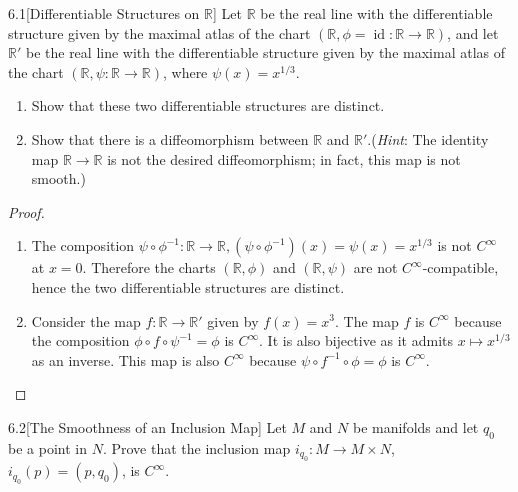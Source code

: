 \begin{problem}{6.1}[Differentiable Structures on \(\mathbb{R}\)]
Let \(\mathbb{R}\) be the real line with the differentiable structure given by the maximal atlas of the chart \((\mathbb{R}, \phi = \operatorname{id} \colon \mathbb{R} \to \mathbb{R})\), and let \(\mathbb{R}'\) be the real line with the differentiable structure given by the maximal atlas of the chart \((\mathbb{R}, \psi \colon \mathbb{R} \to \mathbb{R})\), where \(\psi(x) = x^{1/3}\).

\begin{enumerate}[label={(\alph*)},leftmargin=*]
	\item Show that these two differentiable structures are distinct.
	\item Show that there is a diffeomorphism between \(\mathbb{R}\) and \(\mathbb{R}'\).\@ (\textit{Hint}: The identity map \(\mathbb{R} \to \mathbb{R}\) is not the desired diffeomorphism; in fact, this map is not smooth.)
\end{enumerate}
\end{problem}

\begin{proof}
	\begin{enumerate}[label={(\alph*)},leftmargin=*]
		\item The composition \( \psi \circ \phi^{-1}: \mathbb{R} \to \mathbb{R}, (\psi \circ \phi^{-1})(x) = \psi(x) = x^{1/3} \) is not \( C^{\infty} \) at \( x = 0 \). Therefore the charts \( (\mathbb{R}, \phi) \) and \( (\mathbb{R}, \psi) \) are not \( C^{\infty} \)-compatible, hence the two differentiable structures are distinct.
		\item Consider the map \( f: \mathbb{R} \to \mathbb{R}' \) given by \( f(x) = x^{3} \). The map \( f \) is \( C^{\infty} \) because the composition \( \phi \circ f \circ \psi^{-1} = \phi \) is \( C^{\infty} \). It is also bijective as it admits \( x \mapsto x^{1/3} \) as an inverse. This map is also \( C^{\infty} \) because \( \psi \circ f^{-1} \circ \phi = \phi \) is \( C^{\infty} \).
	\end{enumerate}
\end{proof}

\begin{problem}{6.2}[The Smoothness of an Inclusion Map]
Let \(M\) and \(N\) be manifolds and let \(q_{0}\) be a point in \(N\). Prove that the inclusion map \(i_{q_{0}}: M \to M \times N\), \(i_{q_{0}}(p) = (p, q_{0})\), is \(C^\infty\).
\end{problem}

